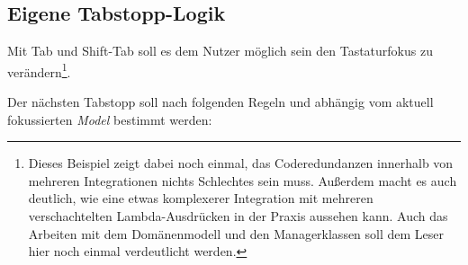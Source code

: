 \subsection{Eigene Tabstopp-Logik}

Mit Tab und Shift-Tab soll es dem Nutzer möglich sein den Tastaturfokus zu
verändern\footnote{Dieses Beispiel zeigt dabei noch einmal, das Coderedundanzen innerhalb
von mehreren Integrationen nichts Schlechtes sein muss.
Außerdem macht es auch deutlich, wie eine etwas komplexerer Integration mit
mehreren verschachtelten Lambda-Ausdrücken in der Praxis aussehen kann. Auch das Arbeiten mit dem Domänenmodell und den Managerklassen soll dem Leser hier noch einmal verdeutlicht werden.}.



Der nächsten Tabstopp soll nach folgenden Regeln und abhängig vom aktuell
fokussierten \textit{Model} bestimmt werden:


